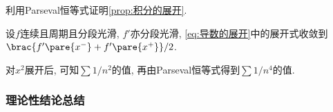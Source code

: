 \documentclass[hidelinks]{ctexart}
\begin{document}
\begin{ex}
    利用Parseval恒等式证明\cref{prop:积分的展开}.
\end{ex}
\begin{ex}
    设$f$连续且周期且分段光滑, $f'$亦分段光滑, \eqref{eq:导数的展开}中的展开式收敛到$\brac{f'\pare{x^-}+f'\pare{x^+}}/2$.
\end{ex}
\begin{ex}
    对$x^2$展开后, 可知$\sum 1/n^2$的值, 再由Parseval恒等式得到$\sum 1/n^4$的值.
\end{ex}


\subsubsection{理论性结论总结} %
\label{ssub:理论性结论总结}
\end{document}
